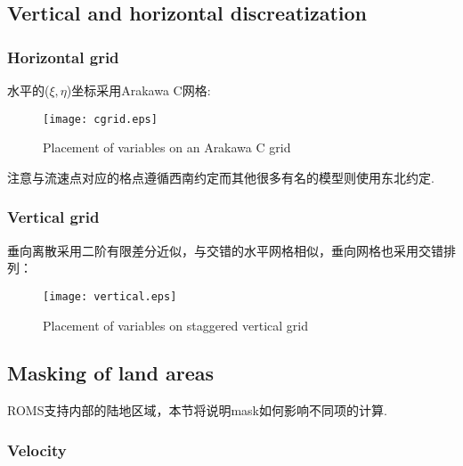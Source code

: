 \documentclass[a3paper,12pt]{article}
\begin{document}
    \subsection{Vertical and horizontal discreatization}
    \subsubsection{Horizontal grid}
    水平的($\xi,\eta$)坐标采用Arakawa C网格:
    \begin{figure}[H]
        \centering\texttt{[image: cgrid.eps]}
        \caption{ Placement of variables on an Arakawa C grid}
    \end{figure}
    注意与流速点对应的格点遵循西南约定而其他很多有名的模型则使用东北约定.
    \subsubsection{Vertical grid}
    垂向离散采用二阶有限差分近似，与交错的水平网格相似，垂向网格也采用交错排列：
    \begin{figure}[H]
        \centering\texttt{[image: vertical.eps]}
        \caption{Placement of variables on staggered vertical grid}
    \end{figure}
    \subsection{Masking of land areas}
    ROMS支持内部的陆地区域，本节将说明mask如何影响不同项的计算.
    \subsubsection{Velocity}
\end{document}
